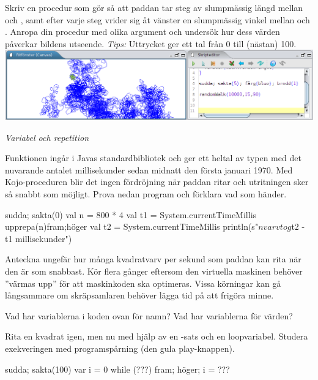 \Subtask Skriv en procedur  som gör så att paddan tar  steg av slumpmässig längd mellan  och , samt efter varje steg vrider sig åt vänster en slumpmässig vinkel mellan  och . Anropa din procedur med olika argument och undersök hur dess värden påverkar bildens utseende. \emph{Tips:} Uttrycket  ger ett tal från 0 till (nästan) 100.
\vspace{1em}\\\includegraphics[width=\textwidth]{../img/kojo/random-walk.png}



\Task \textit{Variabel och repetition}

\Subtask Funktionen  ingår i Javas standardbibliotek och ger ett heltal av typen  med det nuvarande antalet millisekunder sedan midnatt den första januari 1970.  Med Kojo-proceduren  blir det ingen fördröjning när paddan ritar och utritningen sker så snabbt som möjligt. Prova nedan program och förklara vad som händer. 
\begin{Code}
sudda; sakta(0)
val n = 800 * 4
val t1 = System.currentTimeMillis  
upprepa(n){fram;höger}
val t2 = System.currentTimeMillis 
println(s"$n varv tog ${t2 - t1} millisekunder")
\end{Code}

\Subtask\Pen Anteckna ungefär hur många kvadratvarv per sekund som paddan kan rita när den är som snabbast. Kör flera gånger eftersom den virtuella maskinen behöver ''värmas upp'' för att maskinkoden ska optimeras. Vissa körningar kan gå långsammare om skräpsamlaren behöver lägga tid på att frigöra minne.

\Subtask\Pen Vad har variablerna i koden ovan för namn? Vad har variablerna för värden? 

\Subtask Rita en kvadrat igen, men nu med hjälp av en -sats och en loopvariabel. Studera exekveringen med programspårning (den gula play-knappen).

\begin{Code}
sudda; sakta(100)
var i = 0
while (???) { fram; höger; i = ??? }
\end{Code}


